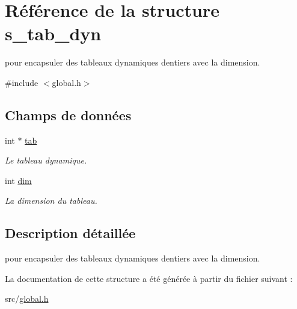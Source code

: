 \hypertarget{structs__tab__dyn}{}\section{Référence de la structure s\+\_\+tab\+\_\+dyn}
\label{structs__tab__dyn}


pour encapsuler des tableaux dynamiques d\textquotesingle{}entiers avec la dimension.  




{\ttfamily \#include $<$global.\+h$>$}

\subsection*{Champs de données}
\begin{DoxyCompactItemize}
\item 
\mbox{\label{structs__tab__dyn_a97599dc347ae84a1df38cab06b50dfa0}} 
int $\ast$ \hyperlink{structs__tab__dyn_a97599dc347ae84a1df38cab06b50dfa0}{tab}
\begin{DoxyCompactList}\small\item\em Le tableau dynamique. \end{DoxyCompactList}\item 
\mbox{\label{structs__tab__dyn_a70b5e28b5bc3d1b63a7435c5fe50b837}} 
int \hyperlink{structs__tab__dyn_a70b5e28b5bc3d1b63a7435c5fe50b837}{dim}
\begin{DoxyCompactList}\small\item\em La dimension du tableau. \end{DoxyCompactList}\end{DoxyCompactItemize}


\subsection{Description détaillée}
pour encapsuler des tableaux dynamiques d\textquotesingle{}entiers avec la dimension. 

La documentation de cette structure a été générée à partir du fichier suivant \+:\begin{DoxyCompactItemize}
\item 
src/\hyperlink{global_8h}{global.\+h}\end{DoxyCompactItemize}

